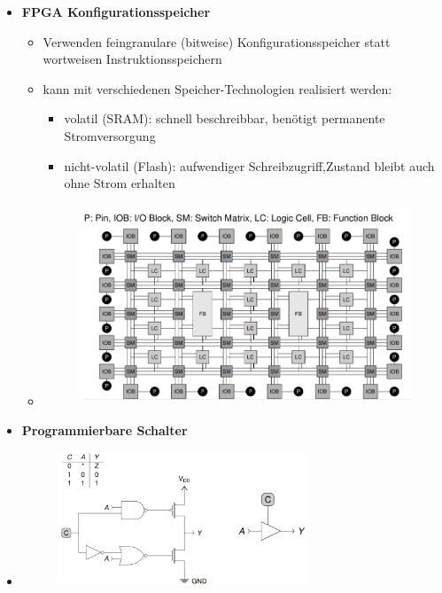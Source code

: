 \documentclass[11pt,a4paper]{article}
\begin{document}
\begin{itemize}
\item \textbf{FPGA Konfigurationsspeicher}
	\begin{itemize}
	\item Verwenden feingranulare (bitweise) Konfigurationsspeicher statt wortweisen Instruktionsspeichern
	\item kann mit verschiedenen Speicher-Technologien realisiert werden:
		\begin{itemize}
		\item volatil (SRAM): schnell beschreibbar, benötigt permanente Stromversorgung
		\item nicht-volatil (Flash): aufwendiger Schreibzugriff,Zustand bleibt auch ohne Strom erhalten
		\end{itemize}
	\item[]
			\begin{figure}[H]
			\begin{center}
			\includegraphics[height=6cm]{Bilder/fpga}
			\end{center}
			\end{figure}
	\end{itemize}

\item \textbf{Programmierbare Schalter}
\item[]
			\begin{figure}[H]
			\begin{center}
			\includegraphics[height=4cm]{Bilder/programmschalter}
			\end{center}
			\end{figure}


\end{itemize}
\end{document}
